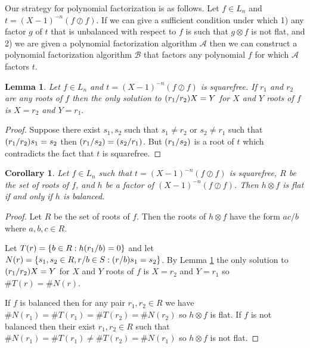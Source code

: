 \documentclass{article}
\let\originalleft\left
\let\originalright\right
\renewcommand{\left}{\mathopen{}\mathclose\bgroup\originalleft}
\renewcommand{\right}{\aftergroup\egroup\originalright}
\newcounter{dummy} \numberwithin{dummy}{section}
\theoremstyle{plain}
\newtheorem{cor}[dummy]{Corollary}
\newtheorem{lem}[dummy]{Lemma}
\theoremstyle{definition}
\def\mcA  {{ \mathcal{A}}}
\def\mcB  {{ \mathcal{B}}}
\begin{document}
		
		Our strategy for polynomial factorization is as follows. Let $ f\in L_n$ and $t=(X-1)^{-n}(f \oslash f)$. If we can give a sufficient condition under which 1) any factor $g$ of $t$ that is unbalanced with respect to $f$ is such that $g \otimes f$ is not flat, and 2) we are given a polynomial factorization algorithm $\mcA$ then we can construct a polynomial factorization algorithm $\mcB$ that factors any polynomial $f$ for which $\mcA$ factors $t$. 
		
		\begin{lem}
		\label{LEM:numBackSolns}
		    Let $f \in L_n$ and $t=(X-1)^{-n}(f \oslash f)$ is squarefree. If $r_1$ and $r_2$ are any roots of $f$ then the only solution to $\left( r_1/r_2 \right) X = Y$ for $X$ and $Y$ roots of $f$ is $X=r_2$ and $Y=r_1.$
		\end{lem}
		
		\begin{proof}
		    Suppose there exist $s_1,s_2$ such that $s_1 \not=r_2$ or $s_2 \not=r_1$ such that $\left( r_1/r_2 \right) s_1 = s_2$ then $\left( r_1/s_2 \right)= \left( s_2/r_1 \right)$. But $\left( r_1/s_2 \right)$ is a root of $t$ which contradicts the fact that $t$ is squarefree. 
		\end{proof}
		
		\begin{cor}
		\label{COR:noBalNoFlat}
		    Let $f \in L_n$ such that $t=(X-1)^{-n}(f \oslash f)$ is squarefree, $R$ be the set of roots of $f$, and $h$ be a factor of  $(X-1)^{-n}(f \oslash f)$. Then $h \otimes f$ is flat if and only if $h$ is balanced. 
		\end{cor}
			
		\begin{proof}
		    Let $R$ be the set of roots of $f$. Then the roots of $h \otimes f$ have the form $ac/b$ where $a,b,c \in R$. 
		
		    Let $T(r)=\{ b \in R : h \left( r_1/b \right) =0  \} $ and let $N(r)=\{ s_1,s_2 \in R, r/b \in S: \left( r/b \right) s_1 =s_2 \}$. By Lemma \ref{LEM:numBackSolns} the only solution to $\left( r_1/r_2 \right) X = Y$ for $X$ and $Y$ roots of $f$ is $X=r_2$ and $Y=r_1$ so $\#T(r)=\#N(r)$. 
		
		    If $f$ is balanced then for any pair $r_1,r_2 \in R$ we have $\#N(r_1)=\#T(r_1) = \#T(r_2) = \#N(r_2)$ so $h \otimes f$ is flat. If $f$ is not balanced then their exist $r_1, r_2 \in R$ such that $\#N(r_1)=\#T(r_1) \not= \#T(r_2) = \#N(r_1)$ so $h \otimes f$ is not flat.
		\end{proof}
		
\end{document}
